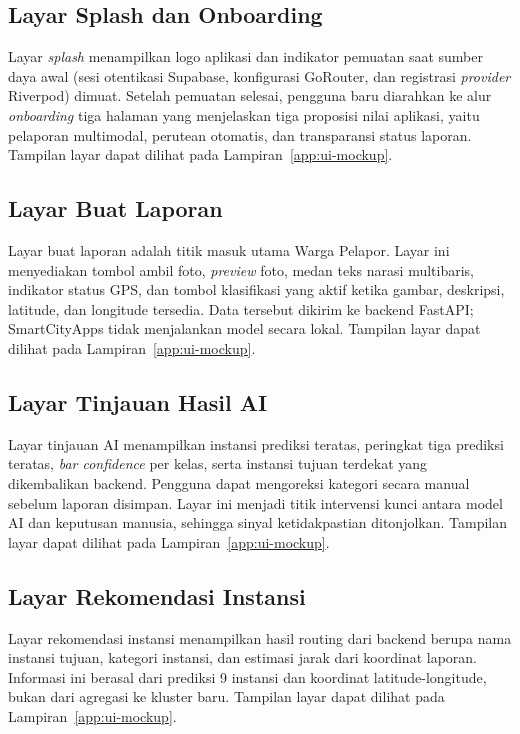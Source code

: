 \subsection{Layar Splash dan Onboarding}

Layar \textit{splash} menampilkan logo aplikasi dan indikator pemuatan saat sumber daya awal (sesi otentikasi Supabase, konfigurasi GoRouter, dan registrasi \textit{provider} Riverpod) dimuat. Setelah pemuatan selesai, pengguna baru diarahkan ke alur \textit{onboarding} tiga halaman yang menjelaskan tiga proposisi nilai aplikasi, yaitu pelaporan multimodal, perutean otomatis, dan transparansi status laporan. Tampilan layar dapat dilihat pada Lampiran~\ref{app:ui-mockup}.

\subsection{Layar Buat Laporan}

Layar buat laporan adalah titik masuk utama Warga Pelapor. Layar ini menyediakan tombol ambil foto, \textit{preview} foto, medan teks narasi multibaris, indikator status GPS, dan tombol klasifikasi yang aktif ketika gambar, deskripsi, latitude, dan longitude tersedia. Data tersebut dikirim ke backend FastAPI; SmartCityApps tidak menjalankan model secara lokal. Tampilan layar dapat dilihat pada Lampiran~\ref{app:ui-mockup}.

\subsection{Layar Tinjauan Hasil AI}

Layar tinjauan AI menampilkan instansi prediksi teratas, peringkat tiga prediksi teratas, \textit{bar confidence} per kelas, serta instansi tujuan terdekat yang dikembalikan backend. Pengguna dapat mengoreksi kategori secara manual sebelum laporan disimpan. Layar ini menjadi titik intervensi kunci antara model AI dan keputusan manusia, sehingga sinyal ketidakpastian ditonjolkan. Tampilan layar dapat dilihat pada Lampiran~\ref{app:ui-mockup}.

\subsection{Layar Rekomendasi Instansi}

Layar rekomendasi instansi menampilkan hasil routing dari backend berupa nama instansi tujuan, kategori instansi, dan estimasi jarak dari koordinat laporan. Informasi ini berasal dari prediksi 9 instansi dan koordinat latitude-longitude, bukan dari agregasi ke kluster baru. Tampilan layar dapat dilihat pada Lampiran~\ref{app:ui-mockup}.

